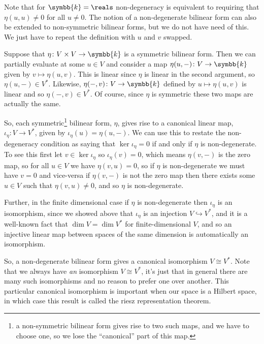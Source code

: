 \documentclass[fleqn]{NotesClass}
\renewcommand{\field}{\symbb{k}}
\newcommand{\isomorphic}{\cong}
\begin{document}
    Note that for \(\field = \reals\) non-degeneracy is equivalent to requiring that \(\eta(u, u) \ne 0\) for all \(u \ne 0\).
    The notion of a non-degenerate bilinear form can also be extended to non-symmetric bilinear forms, but we do not have need of this.
    We just have to repeat the definition with \(u\) and \(v\) swapped.
    
    Suppose that \(\eta \colon V \times V \to \field\) is a symmetric bilinear form.
    Then we can partially evaluate at some \(u \in V\) and consider a map \(\eta(u, -) \colon V \to \field\) given by \(v \mapsto \eta(u, v)\).
    This is linear since \(\eta\) is linear in the second argument, so \(\eta(u, -) \in V^*\).
    Likewise, \(\eta(-, v) \colon V \to \field\) defined by \(u \mapsto \eta(u, v)\) is linear and so \(\eta(-, v) \in V^*\).
    Of course, since \(\eta\) is symmetric these two maps are actually the same.
    
    So, each symmetric\footnote{a non-symmetric bilinear form gives rise to two such maps, and we have to choose one, so we lose the \enquote{canonical} part of this map.} bilinear form, \(\eta\), gives rise to a canonical linear map, \(\iota_\eta \colon V \to V^*\), given by \(\iota_\eta(u) = \eta(u, -)\).
    We can use this to restate the non-degeneracy condition as saying that \(\ker \iota_\eta = 0\) if and only if \(\eta\) is non-degenerate.
    To see this first let \(v \in \ker \iota_\eta\) so \(\iota_\eta(v) = 0\), which means \(\eta(v, -)\) is the zero map, so for all \(u \in V\) we have \(\eta(v, u) = 0\), so if \(\eta\) is non-degenerate we must have \(v = 0\) and vice-versa if \(\eta(v, -)\) is not the zero map then there exists some \(u \in V\) such that \(\eta(v, u) \ne 0\), and so \(\eta\) is non-degenerate.
    
    Further, in the finite dimensional case if \(\eta\) is non-degenerate then \(\iota_\eta\) is an isomorphism, since we showed above that \(\iota_\eta\) is an injection \(V \hookrightarrow V^*\), and it is a well-known fact that \(\dim V = \dim V^*\) for finite-dimensional \(V\), and so an injective linear map between spaces of the same dimension is automatically an isomorphism.
    
    So, a non-degenerate bilinear form gives a canonical isomorphism \(V \isomorphic V^*\).
    Note that we always have \emph{an} isomorphism \(V \isomorphic V^*\), it's just that in general there are many such isomorphisms and no reason to prefer one over another.
    This particular canonical isomorphism is important when our space is a Hilbert space, in which case this result is called the riesz representation theorem.
    
\end{document}
